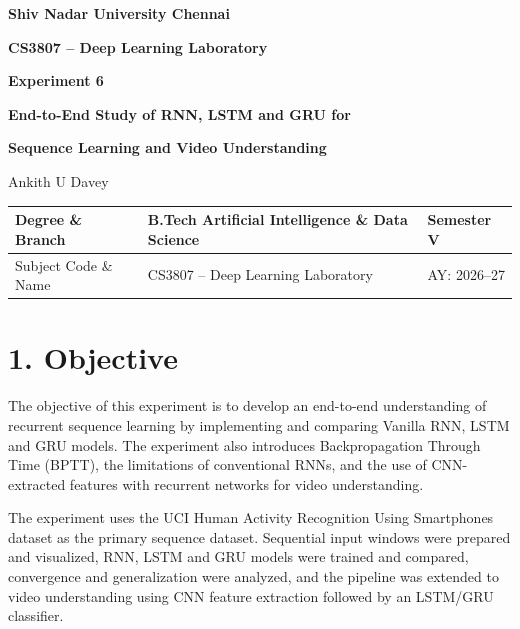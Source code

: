 \documentclass[10pt]{article}
\begin{document}

\begin{center}

{\large\textbf{Shiv Nadar University Chennai}}

\vspace{2mm}

{\normalsize\textbf{CS3807 -- Deep Learning Laboratory}}

\vspace{2mm}

{\large\textbf{Experiment 6}}

\vspace{1mm}

{\normalsize\textbf{End-to-End Study of RNN, LSTM and GRU for}}

{\normalsize\textbf{Sequence Learning and Video Understanding}}

\vspace{2mm}

{\normalsize Ankith U Davey }

\end{center}

\vspace{3mm}

\begin{tabular}{|p{3.4cm}|p{9.0cm}|p{1.4cm}|}
\hline
Degree \& Branch &
B.Tech Artificial Intelligence \& Data Science &
Semester V\\
\hline
Subject Code \& Name &
CS3807 -- Deep Learning Laboratory &
AY: 2026--27\\
\hline
\end{tabular}

\section*{1. Objective}

The objective of this experiment is to develop an end-to-end understanding of
recurrent sequence learning by implementing and comparing Vanilla RNN, LSTM
and GRU models. The experiment also introduces Backpropagation Through Time
(BPTT), the limitations of conventional RNNs, and the use of CNN-extracted
features with recurrent networks for video understanding.

The experiment uses the UCI Human Activity Recognition Using Smartphones
dataset as the primary sequence dataset. Sequential input windows were
prepared and visualized, RNN, LSTM and GRU models were trained and compared,
convergence and generalization were analyzed, and the pipeline was extended
to video understanding using CNN feature extraction followed by an LSTM/GRU
classifier.
\end{document}
